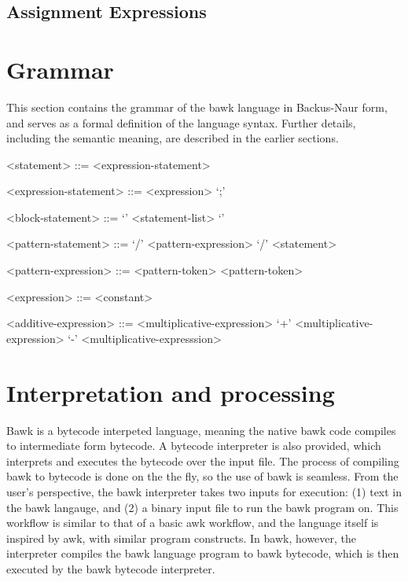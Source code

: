 \documentclass[letterpaper]{article}
\begin{document}

\subsection{Assignment Expressions}




\section{Grammar}
This section contains the grammar of the bawk language in Backus-Naur form, and serves as a formal definition of the language syntax.  Further details, including the semantic meaning, are described in the earlier sections.
\begin{grammar}

<statement> ::= <expression-statement>

<expression-statement> ::= <expression> `;'

<block-statement> ::= `{' <statement-list> `}'

<pattern-statement> ::= `/' <pattern-expression> `/' <statement>

<pattern-expression> ::= <pattern-token>
 <pattern-token>


<expression> ::= <constant>

<additive-expression> ::= <multiplicative-expression>
 `+' <multiplicative-expression>
 `-' <multiplicative-expresssion>
\end{grammar}

\section{Interpretation and processing}
\label{sec:interpretation}
Bawk is a bytecode interpeted language, meaning the native bawk code compiles to intermediate form bytecode.  A bytecode interpreter is also provided, which interprets and executes the bytecode over the input file.  The process of compiling bawk to bytecode is done on the the fly, so the use of bawk is seamless.  From the user's perspective, the bawk interpreter takes two inputs for execution: (1) text in the bawk langauge, and (2) a binary input file to run the bawk program on.  This workflow is similar to that of a basic awk workflow, and the language itself is inspired by awk, with similar program constructs.  In bawk, however, the interpreter compiles the bawk language program to bawk bytecode, which is then executed by the bawk bytecode interpreter.
\end{document}
